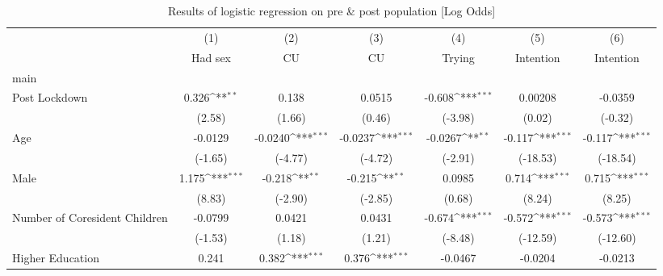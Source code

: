 \begin{table}[htbp]\centering
\def\sym#1{\ifmmode^{#1}\else\(^{#1}\)\fi}
\caption{Results of logistic regression on pre \& post population [Log Odds]}
\begin{tabular}{l*{6}{c}}
\hline\hline
                    &\multicolumn{1}{c}{(1)}&\multicolumn{1}{c}{(2)}&\multicolumn{1}{c}{(3)}&\multicolumn{1}{c}{(4)}&\multicolumn{1}{c}{(5)}&\multicolumn{1}{c}{(6)}\\
                    &\multicolumn{1}{c}{Had sex}&\multicolumn{1}{c}{CU}&\multicolumn{1}{c}{CU}&\multicolumn{1}{c}{Trying}&\multicolumn{1}{c}{Intention}&\multicolumn{1}{c}{Intention}\\
\hline
main                &                     &                     &                     &                     &                     &                     \\
Post Lockdown       &       0.326\sym{**} &       0.138         &      0.0515         &      -0.608\sym{***}&     0.00208         &     -0.0359         \\
                    &      (2.58)         &      (1.66)         &      (0.46)         &     (-3.98)         &      (0.02)         &     (-0.32)         \\
[1em]
Age                 &     -0.0129         &     -0.0240\sym{***}&     -0.0237\sym{***}&     -0.0267\sym{**} &      -0.117\sym{***}&      -0.117\sym{***}\\
                    &     (-1.65)         &     (-4.77)         &     (-4.72)         &     (-2.91)         &    (-18.53)         &    (-18.54)         \\
[1em]
Male                &       1.175\sym{***}&      -0.218\sym{**} &      -0.215\sym{**} &      0.0985         &       0.714\sym{***}&       0.715\sym{***}\\
                    &      (8.83)         &     (-2.90)         &     (-2.85)         &      (0.68)         &      (8.24)         &      (8.25)         \\
[1em]
Number of Coresident Children&     -0.0799         &      0.0421         &      0.0431         &      -0.674\sym{***}&      -0.572\sym{***}&      -0.573\sym{***}\\
                    &     (-1.53)         &      (1.18)         &      (1.21)         &     (-8.48)         &    (-12.59)         &    (-12.60)         \\
[1em]
Higher Education    &       0.241         &       0.382\sym{***}&       0.376\sym{***}&     -0.0467         &     -0.0204         &     -0.0213         \\

\end{tabular}
\end{table}
